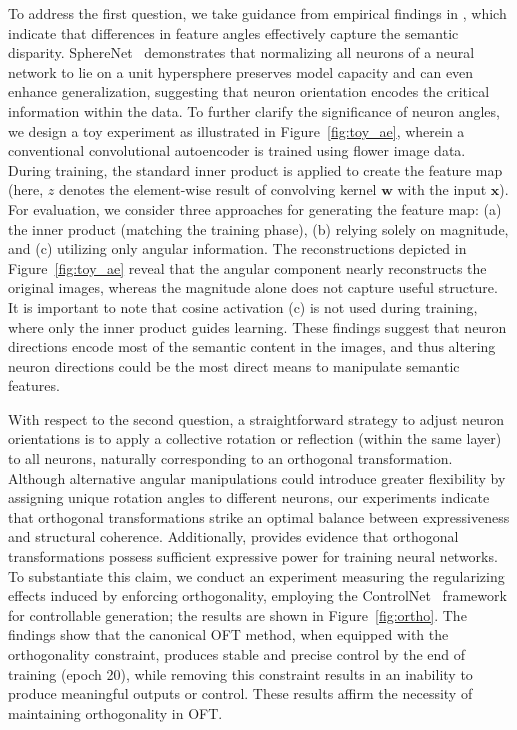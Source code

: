 To address the first question, we take guidance from empirical findings in \cite{liu2018decoupled,chen2020angular}, which indicate that differences in feature angles effectively capture the semantic disparity. SphereNet~\cite{liu2017deep} demonstrates that normalizing all neurons of a neural network to lie on a unit hypersphere preserves model capacity and can even enhance generalization, suggesting that neuron orientation encodes the critical information within the data. To further clarify the significance of neuron angles, we design a toy experiment as illustrated in Figure~\ref{fig:toy_ae}, wherein a conventional convolutional autoencoder is trained using flower image data. During training, the standard inner product is applied to create the feature map (here, $z$ denotes the element-wise result of convolving kernel $\bm{w}$ with the input $\bm{x}$). For evaluation, we consider three approaches for generating the feature map: (a) the inner product (matching the training phase), (b) relying solely on magnitude, and (c) utilizing only angular information. The reconstructions depicted in Figure~\ref{fig:toy_ae} reveal that the angular component nearly reconstructs the original images, whereas the magnitude alone does not capture useful structure. It is important to note that cosine activation (c) is not used during training, where only the inner product guides learning. These findings suggest that neuron directions encode most of the semantic content in the images, and thus altering neuron directions could be the most direct means to manipulate semantic features.

With respect to the second question, a straightforward strategy to adjust neuron orientations is to apply a collective rotation or reflection (within the same layer) to all neurons, naturally corresponding to an orthogonal transformation. Although alternative angular manipulations could introduce greater flexibility by assigning unique rotation angles to different neurons, our experiments indicate that orthogonal transformations strike an optimal balance between expressiveness and structural coherence. Additionally, \cite{liu2021orthogonal} provides evidence that orthogonal transformations possess sufficient expressive power for training neural networks. To substantiate this claim, we conduct an experiment measuring the regularizing effects induced by enforcing orthogonality, employing the ControlNet~\cite{zhang2023adding} framework for controllable generation; the results are shown in Figure~\ref{fig:ortho}. The findings show that the canonical OFT method, when equipped with the orthogonality constraint, produces stable and precise control by the end of training (epoch 20), while removing this constraint results in an inability to produce meaningful outputs or control. These results affirm the necessity of maintaining orthogonality in OFT.

